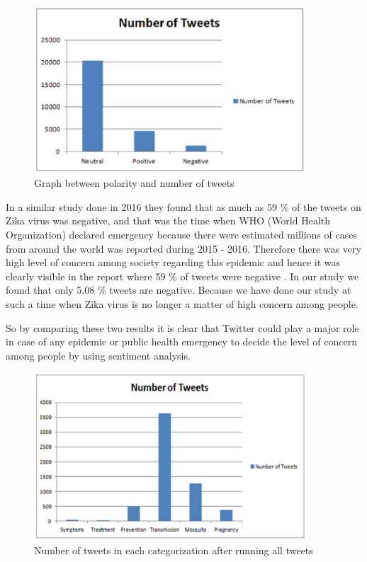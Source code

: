  \begin{figure}[h]
\label{ut2}
\centerline{\includegraphics[width=4in]{ut2}}
\caption{Graph between polarity and number of tweets}
\end{figure}
In a similar study done in 2016 \cite{edtr10} they found  that as much as 59 \% of the tweets on Zika virus was negative, and that was the time when WHO (World Health Organization) declared emergency \cite{edtr11,edtr12} because there were estimated  millions of cases from around the world was reported during 2015 - 2016. Therefore there was very high level of concern among society  regarding this epidemic  and hence it was clearly visible in the report where 59 \%  of tweets were negative . In our study we  found that only  5.08 \%  tweets are negative. Because we have done  our study at  such a time when Zika virus is no longer a matter of high concern among people.
\par So by  comparing these two results it is clear that Twitter could play a major role in case of any epidemic or public health emergency to decide the level of concern among people by using sentiment analysis.
 \begin{figure}[h]
\label{ut3}
\centerline{\includegraphics[width=4in]{ut3}}
\caption{Number of tweets in each categorization after running all tweets}
\end{figure}
